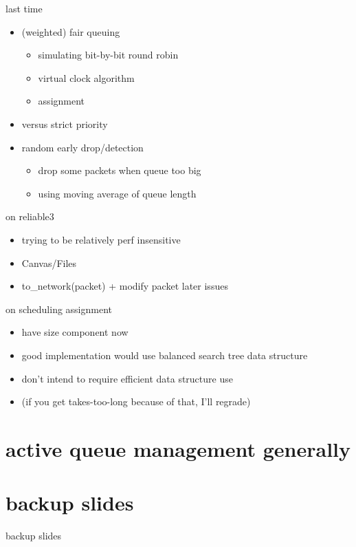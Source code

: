 \date{}
\title{}
\date{}

\begin{frame}
    \titlepage
\end{frame}

\begin{frame}{last time}
    \begin{itemize}
    \item (weighted) fair queuing
        \begin{itemize}
        \item simulating bit-by-bit round robin
        \item virtual clock algorithm
        \item assignment
        \end{itemize}
    \item versus strict priority
    \item random early drop/detection
        \begin{itemize}
        \item drop some packets when queue too big
        \item using moving average of queue length
        \end{itemize}
    \end{itemize}
\end{frame}

\begin{frame}{on reliable3}
    \begin{itemize}
    \item trying to be relatively perf insensitive
    \vspace{.5cm}
    \item Canvas/Files
    \vspace{.5cm}
    \item to\_network(packet) + modify packet later issues
    \end{itemize}
\end{frame}

\begin{frame}{on scheduling assignment}
    \begin{itemize}
    \item have size component now
    \vspace{.5cm}
    \item good implementation would use balanced search tree data structure
    \item don't intend to require efficient data structure use
    \item (if you get takes-too-long because of that, I'll regrade)
    \end{itemize}
\end{frame}

\section{active queue management generally}




\section{backup slides}
\begin{frame}{backup slides}
\end{frame}


